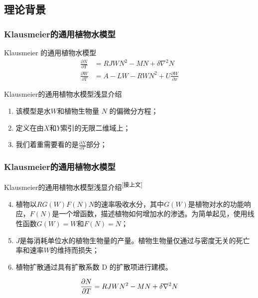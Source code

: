 \documentclass[aspectratio=169, 12pt, utf8, mathserif]{ctexbeamer} %
\begin{document}
\subsection{理论背景}
\begin{frame}
	\frametitle{Klausmeier的通用植物水模型}
	\begin{exampleblock}{Klausmeier 的通用植物水模型\cite{[1]}}
		\begin{align*}
			\frac{\partial N}{\partial T} &= RJWN^2 - MN + \delta\nabla^2N \\
			\frac{\partial W}{\partial T} &= A - LW - RWN^2 + U\frac{\partial W}{\partial x}
		\end{align*}
	\end{exampleblock}


	\begin{exampleblock}{Klausmeier的通用植物水模型浅显介绍}
		\begin{enumerate}
			\item 该模型是水\(W\)和植物生物量 \(N\) 的偏微分方程；
			\item 定义在由\(X\)和\(Y\)索引的无限二维域上；
			\item 我们着重需要看的是\(\frac{\partial N}{\partial T}\)部分；
		\end{enumerate}
	\end{exampleblock}
\end{frame}

	

\begin{frame}
	\frametitle{Klausmeier的通用植物水模型}
	\begin{exampleblock}{Klausmeier的通用植物水模型浅显介绍\textsuperscript{{\tiny [接上文]}}}
		\begin{enumerate}
			\setcounter{enumi}{3} %
			\item 植物以\(RG(W)F(N)N\)的速率吸收水分，其中\(G(W)\)是植物对水的功能响应，\(F(N)\)是一个增函数，描述植物如何增加水的渗透。为简单起见，使用线性函数\(G(W)=W\)和\(F(N)=N\)；
			\item \(J\)是每消耗单位水的植物生物量的产量。植物生物量仅通过与密度无关的死亡率和速率\(W\)的维持而损失；
			\item 植物扩散通过具有扩散系数 D 的扩散项进行建模。
		\end{enumerate}
		
		\begin{equation}
			\frac{\partial N}{\partial T} = RJWN^2 - MN + \delta\nabla^2N \notag
		\end{equation}
	\end{exampleblock}
\end{frame}
\end{document}
